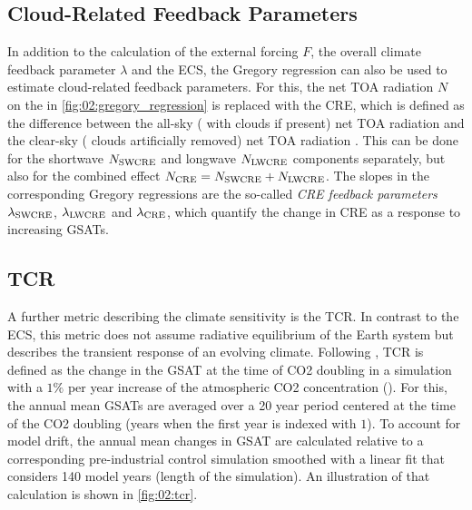 \subsection{Cloud-Related Feedback Parameters}
\label{subsec:02:cloud_feedback_parameters}

In addition to the calculation of the external forcing $F$, the overall climate
feedback parameter $\lambda$ and the \ac{ECS}, the Gregory regression can also
be used to estimate cloud-related feedback parameters. For this, the net
\ac{TOA} radiation $N$ on the \yaxis{} in \cref{fig:02:gregory_regression} is
replaced with the \ac{CRE}, which is defined as the difference between the
all-sky (\ie{} with clouds if present) net \ac{TOA} radiation and the clear-sky
(\ie{} clouds artificially removed) net \ac{TOA} radiation
\autocite{Andrews2012}. This can be done for the shortwave $N_\textnormal{SWCRE}$
and longwave $N_\textnormal{LWCRE}$ components separately, but also for the
combined effect $N_\textnormal{CRE} = N_\textnormal{SWCRE} + N_\textnormal{LWCRE}$. The
slopes in the corresponding Gregory regressions are the so-called
\emph{\ac{CRE} feedback parameters} $\lambda_\textnormal{SWCRE}$,
$\lambda_\textnormal{LWCRE}$ and $\lambda_\textnormal{CRE}$, which quantify the
change in \ac{CRE} as a response to increasing \acp{GSAT}.


\subsection{\acl{TCR}}
\label{subsec:02:tcr}

A further metric describing the climate sensitivity is the \ac{TCR}. In
contrast to the \ac{ECS}, this metric does not assume radiative equilibrium of
the Earth system but describes the transient response of an evolving climate.
Following \textcite{Bindoff2013}, \ac{TCR} is defined as the change in the
\ac{GSAT} at the time of \ac{CO2} doubling in a simulation with a $1 \unit{\%}$
per year increase of the atmospheric \ac{CO2} concentration (\onepctcotwo{}).
For this, the annual mean \acp{GSAT} are averaged over a 20 year period
centered at the time of the \ac{CO2} doubling (years  when the
first year is indexed with $1$). To account for model drift, the annual mean
changes in \ac{GSAT} are calculated relative to a corresponding pre-industrial
control simulation smoothed with a linear fit that considers 140 model years
(length of the \onepctcotwo{} simulation). An illustration of that calculation
is shown in \cref{fig:02:tcr}.

